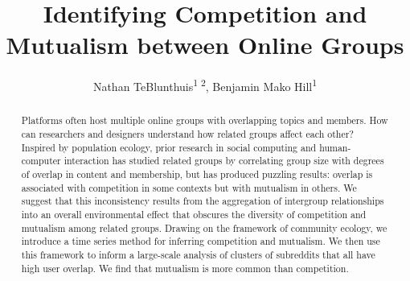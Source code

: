 \documentclass[letterpaper]{article}\usepackage[]{graphicx}\usepackage[]{color}
\title{Identifying Competition and Mutualism between Online Groups}
\author{
 Nathan TeBlunthuis\textsuperscript{\rm  1 2},
 Benjamin Mako Hill\textsuperscript{\rm 1}\\}
\begin{document}
 

\maketitle


\begin{abstract}
Platforms often host multiple online groups with overlapping topics and members. How can researchers and designers understand how related groups affect each other? Inspired by population ecology, prior research in social computing and human-computer interaction has studied related groups by correlating group size with degrees of overlap in content and membership, but has produced puzzling results: overlap is associated with competition in some contexts but with mutualism in others. We suggest that this inconsistency results from the aggregation of intergroup relationships into an overall environmental effect that obscures the diversity of competition and mutualism among related groups. 
Drawing on the framework of community ecology, we introduce a time series method for inferring competition and mutualism. 
We then use this framework to inform a large-scale analysis of clusters of subreddits that all have high user overlap. We find that mutualism is more common than competition.
\end{abstract}


\end{document}
